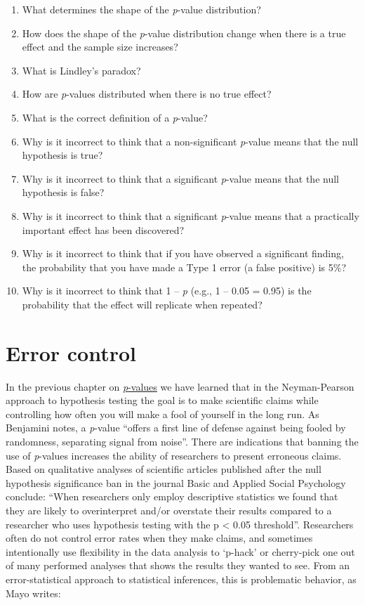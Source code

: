 \documentclass[
  oneside]{book}
\begin{document}
\begin{enumerate}
\def\labelenumi{\arabic{enumi}.}
\item
  What determines the shape of the \emph{p}-value distribution?
\item
  How does the shape of the \emph{p}-value distribution change when there is a true effect and the sample size increases?
\item
  What is Lindley's paradox?
\item
  How are \emph{p}-values distributed when there is no true effect?
\item
  What is the correct definition of a \emph{p}-value?
\item
  Why is it incorrect to think that a non-significant \emph{p}-value means that the null hypothesis is true?
\item
  Why is it incorrect to think that a significant \emph{p}-value means that the null hypothesis is false?
\item
  Why is it incorrect to think that a significant \emph{p}-value means that a practically important effect has been discovered?
\item
  Why is it incorrect to think that if you have observed a significant finding, the probability that you have made a Type 1 error (a false positive) is 5\%?
\item
  Why is it incorrect to think that 1 -- \emph{p} (e.g., 1 -- 0.05 = 0.95) is the probability that the effect will replicate when repeated?
\end{enumerate}

\hypertarget{errorcontrol}{%
\chapter{Error control}\label{errorcontrol}}

In the previous chapter on \protect\hyperlink{pvalue}{\emph{p}-values} we have learned that in the Neyman-Pearson approach to hypothesis testing the goal is to make scientific claims while controlling how often you will make a fool of yourself in the long run. As Benjamini \citeyearpar{benjamini_its_2016} notes, a \emph{p}-value ``offers a first line of defense against being fooled by randomness, separating signal from noise''. There are indications that banning the use of \emph{p}-values increases the ability of researchers to present erroneous claims. Based on qualitative analyses of scientific articles published after the null hypothesis significance ban in the journal Basic and Applied Social Psychology \citet{fricker_assessing_2019} conclude: ``When researchers only employ descriptive statistics we found that they are likely to overinterpret and/or overstate their results compared to a researcher who uses hypothesis testing with the p \textless{} 0.05 threshold''. Researchers often do not control error rates when they make claims, and sometimes intentionally use flexibility in the data analysis to `p-hack' or cherry-pick one out of many performed analyses that shows the results they wanted to see. From an error-statistical approach to statistical inferences, this is problematic behavior, as Mayo \citeyearpar{mayo_statistical_2018} writes:
\end{document}
